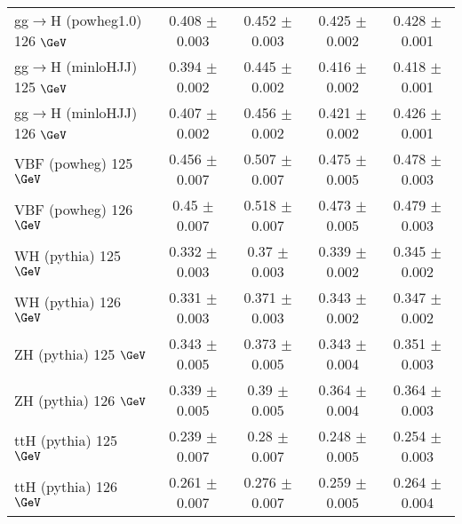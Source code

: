 \begin{sidewaystable}[!h!tb]
\begin{center}
\begin{tabular}{|l|c|c|c|c|}
gg$\rightarrow$H ({\sc powheg1.0}) 126 $\GeV$  & 0.408  $\pm$  0.003  & 0.452  $\pm$  0.003  & 0.425  $\pm$  0.002  & 0.428  $\pm$  0.001  \\
gg$\rightarrow$H ({\sc minloHJJ}) 125 $\GeV$  & 0.394  $\pm$  0.002  & 0.445  $\pm$  0.002  & 0.416  $\pm$  0.002  & 0.418  $\pm$  0.001  \\
gg$\rightarrow$H ({\sc minloHJJ}) 126 $\GeV$  & 0.407  $\pm$  0.002  & 0.456  $\pm$  0.002  & 0.421  $\pm$  0.002  & 0.426  $\pm$  0.001  \\
VBF ({\sc powheg}) 125 $\GeV$  & 0.456  $\pm$  0.007  & 0.507  $\pm$  0.007  & 0.475  $\pm$  0.005  & 0.478  $\pm$  0.003  \\
VBF ({\sc powheg}) 126 $\GeV$  & 0.45  $\pm$  0.007  & 0.518  $\pm$  0.007  & 0.473  $\pm$  0.005  & 0.479  $\pm$  0.003  \\
WH ({\sc pythia}) 125 $\GeV$  & 0.332  $\pm$  0.003  & 0.37  $\pm$  0.003  & 0.339  $\pm$  0.002  & 0.345  $\pm$  0.002  \\
WH ({\sc pythia}) 126 $\GeV$  & 0.331  $\pm$  0.003  & 0.371  $\pm$  0.003  & 0.343  $\pm$  0.002  & 0.347  $\pm$  0.002  \\
ZH ({\sc pythia}) 125 $\GeV$  & 0.343  $\pm$  0.005  & 0.373  $\pm$  0.005  & 0.343  $\pm$  0.004  & 0.351  $\pm$  0.003  \\
ZH ({\sc pythia}) 126 $\GeV$  & 0.339  $\pm$  0.005  & 0.39  $\pm$  0.005  & 0.364  $\pm$  0.004  & 0.364  $\pm$  0.003  \\
ttH ({\sc pythia}) 125 $\GeV$  & 0.239  $\pm$  0.007  & 0.28  $\pm$  0.007  & 0.248  $\pm$  0.005  & 0.254  $\pm$  0.003  \\
ttH ({\sc pythia}) 126 $\GeV$  & 0.261  $\pm$  0.007  & 0.276  $\pm$  0.007  & 0.259  $\pm$  0.005  & 0.264  $\pm$  0.004  \\
\hline
\end{tabular}
\normalsize
\end{center}
 \end{sidewaystable}
